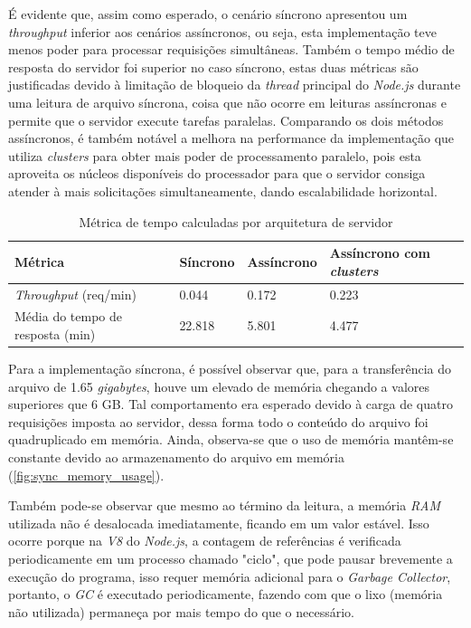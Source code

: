 \documentclass[12pt]{article}
\begin{document}
É evidente que, assim como
esperado, o cenário síncrono apresentou um \textit{throughput} inferior aos cenários assíncronos, ou seja, esta implementação
teve menos poder para processar requisições simultâneas. Também o tempo médio de resposta do servidor foi superior no caso
síncrono, estas duas métricas são justificadas devido à limitação de bloqueio da \textit{thread} principal do 
\textit{Node.js} durante uma leitura de arquivo síncrona, coisa que não ocorre em leituras assíncronas e permite que o
servidor execute tarefas paralelas. Comparando os dois métodos assíncronos, é também notável a melhora na performance da 
implementação que utiliza \textit{clusters} para obter mais poder de processamento paralelo, pois esta aproveita
os núcleos disponíveis do processador para que o servidor consiga atender à mais solicitações simultaneamente,
dando escalabilidade horizontal.

\begin{table}[H]
\footnotesize
\centering
\caption{Métrica de tempo calculadas por arquitetura de servidor}\label{tab:metrics}
\begin{tabular}{|p{3cm}|p{3cm}|p{3cm}|p{3cm}|}
\hline
\textbf{Métrica} & \textbf{Síncrono} & \textbf{Assíncrono} & \textbf{Assíncrono com \textit{clusters}} \\
\hline
\textit{Throughput} (req/min) & 0.044 & 0.172 & 0.223\\
\hline
Média do tempo de resposta (min) & 22.818 & 5.801 & 4.477\\
\hline
\end{tabular}
\end{table}


Para a implementação síncrona, é possível observar que, para a transferência do arquivo de 1.65 \textit{gigabytes}, 
houve um elevado de memória chegando a valores superiores que 6 GB. Tal comportamento era esperado
devido à carga de quatro requisições imposta ao servidor, dessa forma todo o conteúdo do arquivo foi quadruplicado em memória.
Ainda, observa-se que o uso de memória mantêm-se constante devido ao armazenamento do 
arquivo em memória (\autoref{fig:sync_memory_usage}).

Também pode-se observar que mesmo ao término da leitura,
a memória \textit{RAM} utilizada não é desalocada imediatamente, ficando em um valor estável.
Isso ocorre porque na \textit{V8} do \textit{Node.js}, a contagem de referências é verificada periodicamente em um
processo chamado "ciclo", que pode pausar brevemente a execução do programa, isso requer memória 
adicional para o \textit{Garbage Collector}, portanto, o \textit{GC} é executado periodicamente,
fazendo com que o lixo (memória não utilizada) permaneça por mais tempo do que o necessário. \cite[p. 35]{DIOGORESENDE}
\end{document}
